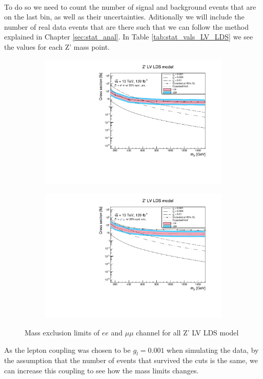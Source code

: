 \documentclass[14pt, a4paper]{book}
\begin{document}
\\To do so we need to count the number of signal and background events that are on the last bin, as well as their uncertainties. Aditionally we will include the number of real data events that are there such that we can follow the 
method explained in Chapter \ref{sec:stat_anal}. In Table \ref{tab:stat_vals_LV_LDS} we see the values for each Z' mass point.
\begin{figure}[!ht]
	\centering
   \begin{subfigure}[b]{0.49\textwidth}
      \centering
      \includegraphics[width=1\textwidth]{Limits/LV_LDS/mass_exclusion_ee.pdf}
      \end{subfigure}
   \hfill
   \begin{subfigure}[b]{0.49\textwidth}
      \centering
      \includegraphics[width=1\textwidth]{Limits/LV_LDS/mass_exclusion_uu.pdf}
      \end{subfigure}
   \caption{Mass exclusion limits of $ee$ and $\mu\mu$ channel for all Z' LV LDS model}\label{fig:LV_LDS_exclusion_ee_uu}
\end{figure}
As the lepton coupling was chosen to be $g_l=0.001$ when simulating the data, by the assumption that the number of events that survived the cuts is the same, we can increase this coupling to see how the mass limits changes.
\end{document}
